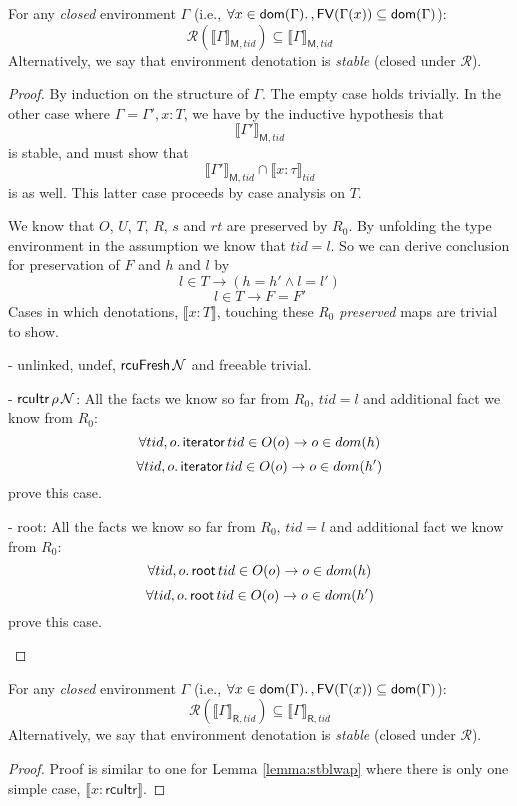 \begin{lemma}\label{lemma:stblwap}
For any \emph{closed} environment $\Gamma$ (i.e., $\forall x\in\mathsf{dom}(\Gamma)\ldotp, \mathsf{FV}(\Gamma(x))\subseteq\mathsf{dom}(\Gamma)$):
\[
\mathcal{R}(\llbracket\Gamma\rrbracket_{\mathsf{M},tid})\subseteq\llbracket\Gamma\rrbracket_{\mathsf{M},tid}
\]
Alternatively, we say that environment denotation is \emph{stable} (closed under $\mathcal{R}$).
\end{lemma}
\begin{proof}
  By induction on the structure of $\Gamma$.  The empty case holds trivially.  In the other case where $\Gamma=\Gamma',x:T$, we have by the inductive hypothesis that
  \[\llbracket\Gamma'\rrbracket_{\mathsf{M},tid}\] is stable, and must show that
  \[\llbracket\Gamma'\rrbracket_{\mathsf{M},tid}\cap\llbracket{x:\tau}\rrbracket_{tid}\] is as well.  This latter case proceeds by case analysis on $T$.

We know that $O$, $U$, $T$, $R$, $s$ and $rt$ are preserved by $R_0$. By unfolding the type environment in the assumption we know that $tid = l$. So we can derive conclusion for preservation of $F$ and $h$ and $l$ by
\[l  \in  T \rightarrow (h = h' \land l=l')\]
\[  l\in T\rightarrow F=F'\]
Cases in which denotations, $\llbracket x:T \rrbracket$, touching these \emph{R$_0$ preserved} maps are trivial to show.
  \begin{case} - \textsf{unlinked}, \textsf{undef}, $\textsf{rcuFresh}\, \mathcal{N}$ and \textsf{freeable} trivial.
\begin{case} - $\textsf{rcuItr}\,\rho\,\mathcal{N}$: All the facts we know so far from $R_0$, $tid=l$ and additional fact we know from $R_0$:
  \[\forall tid,o\ldotp\textsf{iterator} \, tid \in O(o) \rightarrow o \in dom(h) \]
  \[\forall tid,o\ldotp\textsf{iterator} \, tid \in O(o) \rightarrow o \in dom(h')\]
  prove this case.
  \end{case}
  \end{case}
  \begin{case} - \textsf{root}: All the facts we know so far from $R_0$, $tid=l$ and additional fact we know from $R_0$:
    \[ \forall tid,o\ldotp\textsf{root} \, tid \in O(o) \rightarrow o \in dom(h) \]
    \[ \forall tid,o\ldotp\textsf{root} \, tid \in O(o) \rightarrow o \in dom(h') \]
    prove this case.
    \end{case}
\end{proof}
\begin{lemma}
  \label{lem:stblRap}
For any \emph{closed} environment $\Gamma$ (i.e., $\forall x\in\mathsf{dom}(\Gamma)\ldotp, \mathsf{FV}(\Gamma(x))\subseteq\mathsf{dom}(\Gamma)$):
\[
\mathcal{R}(\llbracket\Gamma\rrbracket_{\mathsf{R},tid})\subseteq\llbracket\Gamma\rrbracket_{\mathsf{R},tid}
\]
Alternatively, we say that environment denotation is \emph{stable} (closed under $\mathcal{R}$).
\end{lemma}
\begin{proof}
Proof is similar to one for Lemma \ref{lemma:stblwap} where there is only one simple case, $\llbracket x:\textsf{rcuItr} \rrbracket$. 
\end{proof}


